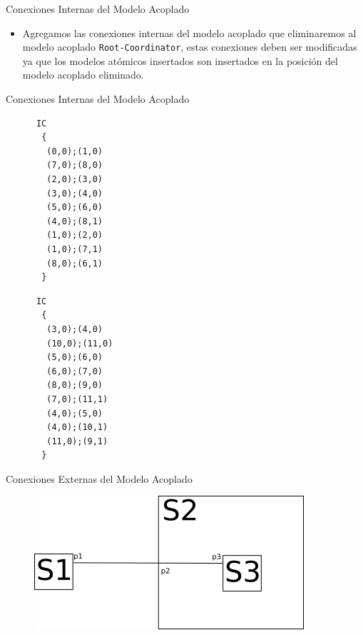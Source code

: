 \documentclass{beamer}
\begin{document}
\begin{frame}[fragile]{Conexiones Internas del Modelo Acoplado}
\begin{itemize}
        \item Agregamos las conexiones internas del modelo acoplado que eliminaremos al modelo acoplado \texttt{Root-Coordinator}, estas conexiones deben ser 
        modificadas ya que los modelos atómicos insertados son insertados en la posición del modelo acoplado eliminado.
\end{itemize}
\end{frame}

\begin{frame}[fragile]{Conexiones Internas del Modelo Acoplado}
\begin{minipage}[t]{.48\textwidth}
\begin{verbatim}
      IC
       {
        (0,0);(1,0)
        (7,0);(8,0)
        (2,0);(3,0)
        (3,0);(4,0)
        (5,0);(6,0)
        (4,0);(8,1)
        (1,0);(2,0)
        (1,0);(7,1)
        (8,0);(6,1)
       }
\end{verbatim}
\end{minipage}\hfill\begin{minipage}[t]{0.48\linewidth}
\begin{verbatim}
      IC
       {
        (3,0);(4,0)
        (10,0);(11,0)
        (5,0);(6,0)
        (6,0);(7,0)
        (8,0);(9,0)
        (7,0);(11,1)
        (4,0);(5,0)
        (4,0);(10,1)
        (11,0);(9,1)
       }
\end{verbatim}
\end{minipage}
\end{frame}

\begin{frame}{Conexiones Externas del Modelo Acoplado}
\begin{figure}[H]
\includegraphics[width=.75\textwidth]{text3418}
\end{figure}
\end{frame}
\end{document}
